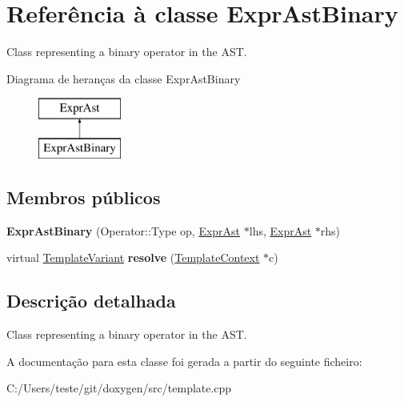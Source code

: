 \hypertarget{class_expr_ast_binary}{\section{Referência à classe Expr\-Ast\-Binary}
\label{class_expr_ast_binary}
}


Class representing a binary operator in the A\-S\-T.  


Diagrama de heranças da classe Expr\-Ast\-Binary\begin{figure}[H]
\begin{center}
\leavevmode
\includegraphics[height=2.000000cm]{class_expr_ast_binary}
\end{center}
\end{figure}
\subsection*{Membros públicos}
\begin{DoxyCompactItemize}
\item 
\hypertarget{class_expr_ast_binary_af2ad9201fcfbdc20c1157711ad23bb8c}{{\bfseries Expr\-Ast\-Binary} (Operator\-::\-Type op, \hyperlink{class_expr_ast}{Expr\-Ast} $\ast$lhs, \hyperlink{class_expr_ast}{Expr\-Ast} $\ast$rhs)}\label{class_expr_ast_binary_af2ad9201fcfbdc20c1157711ad23bb8c}

\item 
\hypertarget{class_expr_ast_binary_a19e3231655a2513f6467bc2b7cf1a9ed}{virtual \hyperlink{class_template_variant}{Template\-Variant} {\bfseries resolve} (\hyperlink{class_template_context}{Template\-Context} $\ast$c)}\label{class_expr_ast_binary_a19e3231655a2513f6467bc2b7cf1a9ed}

\end{DoxyCompactItemize}


\subsection{Descrição detalhada}
Class representing a binary operator in the A\-S\-T. 

A documentação para esta classe foi gerada a partir do seguinte ficheiro\-:\begin{DoxyCompactItemize}
\item 
C\-:/\-Users/teste/git/doxygen/src/template.\-cpp\end{DoxyCompactItemize}
